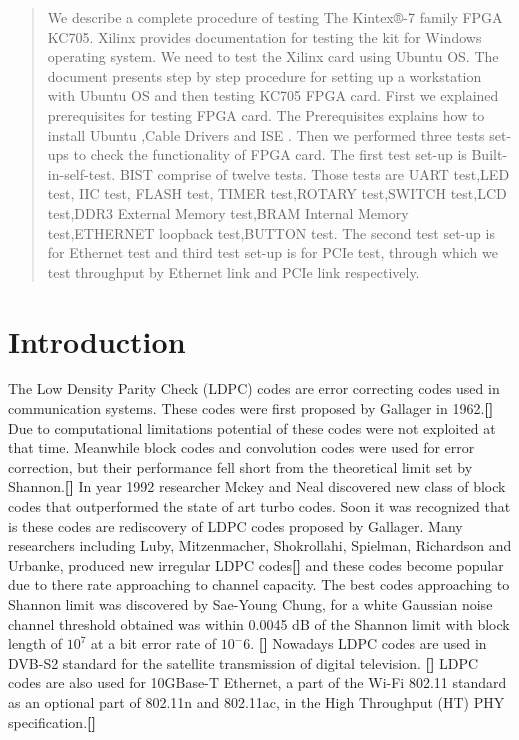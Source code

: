\documentclass[twopage,12pt,a4paper]{report}
\begin{document}
\begin{raggedright}
\normalsize



\setcounter{page}{1}
\tableofcontents
\cleardoublepage 

\clearpage


\begin{abstract}
   We describe a complete procedure of testing The Kintex®-7 family FPGA KC705. Xilinx provides documentation for testing the kit for Windows operating system. We need to test the Xilinx card using Ubuntu OS. The document presents step by step procedure for setting up a workstation with Ubuntu OS and then testing KC705 FPGA card.
   First we explained prerequisites for testing FPGA card. The Prerequisites explains how to install Ubuntu ,Cable Drivers and ISE .
   Then we performed three tests set-ups to check the functionality of FPGA card. 
   The first test set-up is Built-in-self-test. BIST comprise of twelve tests. Those tests are UART test,LED test, IIC test, FLASH test, TIMER test,ROTARY test,SWITCH test,LCD test,DDR3 External Memory test,BRAM Internal Memory test,ETHERNET loopback test,BUTTON test. 
   The second test set-up is for Ethernet test and third test set-up is for PCIe test, through which we test throughput by Ethernet link and PCIe link respectively. 
   
\end{abstract}



\chapter{Introduction}
\setcounter{page}{1}

The Low Density Parity Check (LDPC) codes are error correcting codes used in communication systems. 
These codes were first proposed by Gallager in 1962.\textbf{[]} 
Due to computational limitations potential of these codes were not exploited at that time. Meanwhile block codes and convolution codes were used for error correction, but their performance fell short from the theoretical limit set by Shannon.\textbf{[] }
In year 1992 researcher Mckey and Neal discovered new class of block codes that outperformed the  state of art turbo codes. 
Soon it was recognized that is these codes are rediscovery of LDPC codes proposed by Gallager. Many researchers
including Luby, Mitzenmacher, Shokrollahi, Spielman, Richardson and Urbanke, produced new irregular LDPC codes\textbf{[]} and these codes become popular due to there rate approaching to channel capacity.
The best codes approaching to Shannon limit was discovered by Sae-Young Chung, for a white Gaussian noise channel threshold obtained was within 0.0045 dB of
the Shannon limit with block length of $10^7$ at a bit error rate of $10^-6$. \textbf{[] }
Nowadays LDPC codes are used in DVB-S2 standard for the satellite transmission of digital television. \textbf{[]} LDPC codes are also used for 10GBase-T Ethernet, a part of the Wi-Fi 802.11 standard as an optional part of 802.11n and 802.11ac, in the High Throughput (HT) PHY specification.\textbf{[]}


\end{raggedright}
\end{document}
